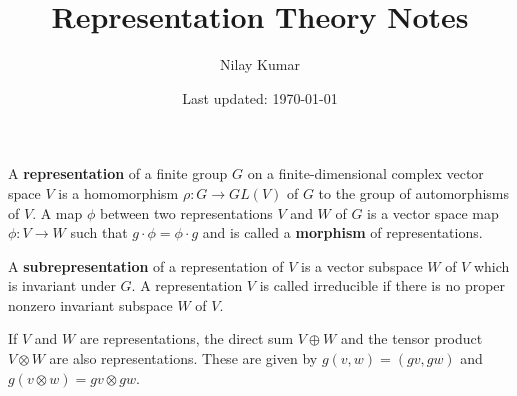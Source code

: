 \documentclass{../mathnotes}
\title{Representation Theory Notes}
\author{Nilay Kumar}
\date{Last updated: \today}
\begin{document}
\maketitle

\setcounter{section}{-1}

\begin{defn}
    A \textbf{representation} of a finite group $G$ on a finite-dimensional complex vector space $V$
    is a homomorphism $\rho: G\to GL(V)$ of $G$ to the group of automorphisms of $V$. A map $\phi$ between
    two representations $V$ and $W$ of $G$ is a vector space map $\phi:V\to W$ such that $g\cdot\phi=\phi\cdot g$
    and is called a \textbf{morphism} of representations.

    A \textbf{subrepresentation} of a representation of $V$ is a vector subspace $W$ of $V$ which is invariant
    under $G$. A representation $V$ is called irreducible if there is no proper nonzero invariant subspace $W$ of $V$.

    If $V$ and $W$ are representations, the direct sum $V\oplus W$ and the tensor product $V\otimes W$ are also representations.
    These are given by $g(v,w)=(gv,gw)$ and $g(v\otimes w)=gv\otimes gw$.
\end{defn}
\end{document}
